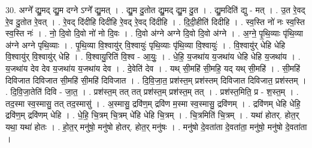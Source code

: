\documentclass[17pt]{extarticle}
\begin{document}
30. अग्ने᳚ द्यु॒मद् द्यु॒म दग्ने ऽग्ने᳚ द्यु॒मत् । . द्यु॒म दु॒तोत द्यु॒मद् द्यु॒म दु॒त । . द्यु॒मदिति॑ द्यु - मत् । . उ॒त रे॒वद् रे॒व दु॒तोत रे॒वत् । . रे॒वद् दि॑दीहि दिदीहि रे॒वद् रे॒वद् दि॑दीहि । . दि॒दी॒हीति॑ दिदीहि । . स्व॒स्ति नो॑ नः स्व॒स्ति स्व॒स्ति नः॑ । . नो॒ दि॒वो दि॒वो नो॑ नो दि॒वः । . दि॒वो अ॑ग्ने अग्ने दि॒वो दि॒वो अ॑ग्ने । . अ॒ग्ने॒ पृ॒थि॒व्याः पृ॑थि॒व्या अ॑ग्ने अग्ने पृथि॒व्याः । . पृ॒थि॒व्या वि॒श्वायु॑र् वि॒श्वायुः॑ पृथि॒व्याः पृ॑थि॒व्या वि॒श्वायुः॑ । . वि॒श्वायु॑र् धेहि धेहि वि॒श्वायु॑र् वि॒श्वायु॑र् धेहि । . वि॒श्वायु॒रिति॑ वि॒श्व - आ॒युः॒ । . धे॒हि॒ य॒जथा॑य य॒जथा॑य धेहि धेहि य॒जथा॑य । . य॒जथा॑य देव देव य॒जथा॑य य॒जथा॑य देव । . दे॒वेति॑ देव । . यथ् सी॒महि॑ सी॒महि॒ यद् यथ् सी॒महि॑ । . सी॒महि॑ दिविजात दिविजात सी॒महि॑ सी॒महि॑ दिविजात । . दि॒वि॒जा॒त॒ प्रश॑स्त॒म् प्रश॑स्तम् दिविजात दिविजात॒ प्रश॑स्तम् । . दि॒वि॒जा॒तेति॑ दिवि - जा॒त॒ । . प्रश॑स्त॒म् तत् तत् प्रश॑स्त॒म् प्रश॑स्त॒म् तत् । . प्रश॑स्त॒मिति॒ प्र - श॒स्त॒म् । . तद॒स्मा स्व॒स्मासु॒ तत् तद॒स्मासु॑ । . अ॒स्मासु॒ द्रवि॑ण॒म् द्रवि॑ण म॒स्मा स्व॒स्मासु॒ द्रवि॑णम् । . द्रवि॑णम् धेहि धेहि॒ द्रवि॑ण॒म् द्रवि॑णम् धेहि । . धे॒हि॒ चि॒त्रम् चि॒त्रम् धे॑हि धेहि चि॒त्रम् । . चि॒त्रमिति॑ चि॒त्रम् । . यथा॑ होतर्. होत॒र् यथा॒ यथा॑ होतः । . हो॒त॒र् मनु॑षो॒ मनु॑षो होतर्. होत॒र् मनु॑षः । . मनु॑षो दे॒वता॑ता दे॒वता॑ता॒ मनु॑षो॒ मनु॑षो दे॒वता॑ता । \newline
\end{document}
